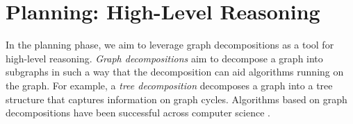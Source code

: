  









\section{Planning: High-Level Reasoning}
In the planning phase, we aim to leverage graph decompositions as a tool for high-level reasoning. \emph{Graph decompositions} \cite{halin1976s,robertson1984graph,RS91,ST94} aim to decompose a graph into subgraphs in such a way that the decomposition can aid algorithms running on the graph.
For example, a \emph{tree decomposition} \cite{halin1976s,robertson1984graph} decomposes a graph into a tree structure that captures information on graph cycles.
Algorithms based on graph decompositions have been successful across computer science \cite{GLST17,MPPV04}.

